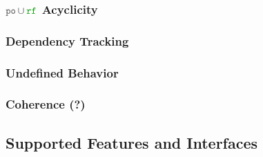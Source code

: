 \subsubsection{$\lPO\cup\lRF$ Acyclicity}

\subsubsection{Dependency Tracking}

\subsubsection{Undefined Behavior}

\subsubsection{Coherence (?)}

\subsection{Supported Features and Interfaces}


